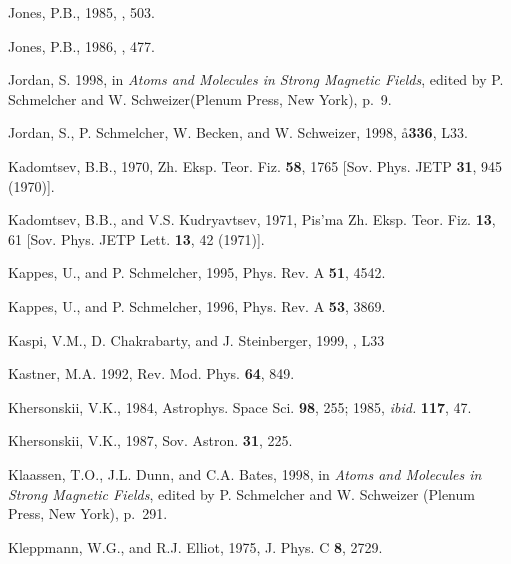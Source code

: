 \begin{references}
\harvarditem{}{}{}
Jones, P.B., 1985, , 503.

\harvarditem{}{}{}
Jones, P.B., 1986, , 477.

\harvarditem{}{}{}
Jordan, S. 1998, in {\it Atoms and Molecules in Strong Magnetic Fields}, edited
by P. Schmelcher and W. Schweizer(Plenum Press, New York), p.~9.

\harvarditem{}{}{}
Jordan, S., P. Schmelcher, W. Becken, and W. Schweizer, 1998, \aa {\bf 336}, 
L33.

\harvarditem{}{}{}
Kadomtsev, B.B., 1970, Zh. Eksp. Teor. Fiz. {\bf 58}, 1765 
[Sov. Phys. JETP {\bf 31}, 945 (1970)].

\harvarditem{}{}{}
Kadomtsev, B.B., and V.S. Kudryavtsev, 1971, Pis'ma Zh. Eksp. Teor. Fiz. 
{\bf 13}, 61 [Sov. Phys. JETP Lett. {\bf 13}, 42 (1971)].

\harvarditem{}{}{}
Kappes, U., and P. Schmelcher, 1995, Phys. Rev. A {\bf 51}, 4542.

\harvarditem{}{}{}
Kappes, U., and P. Schmelcher, 1996, Phys. Rev. A {\bf 53}, 3869.

\harvarditem{}{}{}
Kaspi, V.M., D. Chakrabarty, and J. Steinberger, 1999, , L33

\harvarditem{}{}{}
Kastner, M.A. 1992, Rev. Mod. Phys. {\bf 64}, 849.

\harvarditem{}{}{}
Khersonskii, V.K., 1984, Astrophys. Space Sci. {\bf 98}, 255;
1985, {\em ibid.} {\bf 117}, 47.
 
\harvarditem{}{}{}
Khersonskii, V.K., 1987, Sov. Astron. {\bf 31}, 225.

\harvarditem{}{}{}
Klaassen, T.O., J.L. Dunn, and C.A. Bates, 1998, in {\it Atoms and
Molecules in Strong Magnetic Fields}, edited by P. Schmelcher and 
W. Schweizer (Plenum Press, New York), p.~291.

\harvarditem{}{}{}
Kleppmann, W.G., and R.J. Elliot, 1975, J. Phys. C {\bf 8}, 2729.


\end{references}
